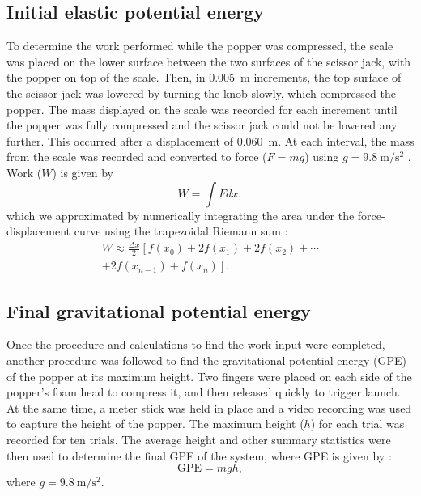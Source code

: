 \documentclass[reprint,amsmath,amssymb,aps,twoside]{revtex4-2} %
\begin{document}
\subsection{Initial elastic potential energy}
To determine the work performed while the popper was compressed, the scale was placed on the lower surface between the two surfaces of the scissor jack, with the popper on top of the scale. Then, in \qty{0.005}{\meter} increments, the top surface of the scissor jack was lowered by turning the knob slowly, which compressed the popper. The mass displayed on the scale was recorded for each increment until the popper was fully compressed and the scissor jack could not be lowered any further. This occurred after a displacement of \qty{0.060}{\meter}. At each interval, the mass from the scale was recorded and converted to force ($F=mg$) using $g=\qty{9.8}{\meter\per\second\squared}$ \cite{tipler,barrons,openstax}. Work ($W$) is given by \cite{tipler,barrons,openstax}
\begin{equation}
W = \int F dx,
\end{equation}
which we approximated by numerically integrating the area under the force-displacement curve using the trapezoidal Riemann sum \cite{calculus,press:1992:numerical,numpy,matplotlib}:
\begin{multline}
W \approx \frac{\Delta x}{2} \left[ f(x_0) + 2f(x_1) + 2f(x_2) + \cdots \right. \\ 
\left. + 2f(x_{n-1}) + f(x_n) \right].
\end{multline}

\subsection{Final gravitational potential energy}
Once the procedure and calculations to find the work input were completed, another procedure was followed to find the gravitational potential energy (GPE) of the popper at its maximum height. Two fingers were placed on each side of the popper's foam head to compress it, and then released quickly to trigger launch. At the same time, a meter stick was held in place and a video recording was used to capture the height of the popper. The maximum height ($h$) for each trial was recorded for ten trials. The average height and other summary statistics were then used to determine the final GPE of the system, where GPE is given by \cite{tipler,barrons,openstax,R}:
\begin{equation}
\text{GPE} = mgh,
\label{eq:gpe}
\end{equation}
where $g=\qty{9.8}{\meter\per\second\squared}$.  
\end{document}
